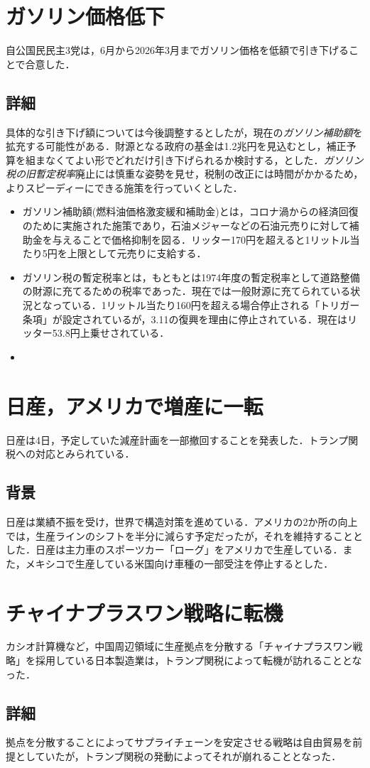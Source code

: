 \documentclass{ltjsarticle}
\begin{document}
\section{ガソリン価格低下}

自公国民民主3党は，6月から2026年3月までガソリン価格を低額で引き下げることで合意した．

\subsection{詳細}

具体的な引き下げ額については今後調整するとしたが，現在の\emph{ガソリン補助額}を拡充する可能性がある．財源となる政府の基金は1.2兆円を見込むとし，補正予算を組まなくてよい形でどれだけ引き下げられるか検討する，とした．\emph{ガソリン税の旧暫定税率}廃止には慎重な姿勢を見せ，税制の改正には時間がかかるため，よりスピーディーにできる施策を行っていくとした．


\begin{itemize}
  \item ガソリン補助額(燃料油価格激変緩和補助金)とは，コロナ渦からの経済回復のために実施された施策であり，石油メジャーなどの石油元売りに対して補助金を与えることで価格抑制を図る．リッター170円を超えると1リットル当たり5円を上限として元売りに支給する．
  \item ガソリン税の暫定税率とは，もともとは1974年度の暫定税率として道路整備の財源に充てるための税率であった．現在では一般財源に充てられている状況となっている．1リットル当たり160円を超える場合停止される「トリガー条項」が設定されているが，3.11の復興を理由に停止されている．現在はリッター53.8円上乗せされている．
  \item 
\end{itemize}



\section{日産，アメリカで増産に一転}

日産は4日，予定していた減産計画を一部撤回することを発表した．トランプ関税への対応とみられている．

\subsection{背景}

日産は業績不振を受け，世界で構造対策を進めている．アメリカの2か所の向上では，生産ラインのシフトを半分に減らす予定だったが，それを維持することとした．日産は主力車のスポーツカー「ローグ」をアメリカで生産している．また，メキシコで生産している米国向け車種の一部受注を停止するとした．



\section{チャイナプラスワン戦略に転機}

カシオ計算機など，中国周辺領域に生産拠点を分散する「チャイナプラスワン戦略」を採用している日本製造業は，トランプ関税によって転機が訪れることとなった．


\subsection{詳細}

拠点を分散することによってサプライチェーンを安定させる戦略は自由貿易を前提としていたが，トランプ関税の発動によってそれが崩れることとなった．
\end{document}
